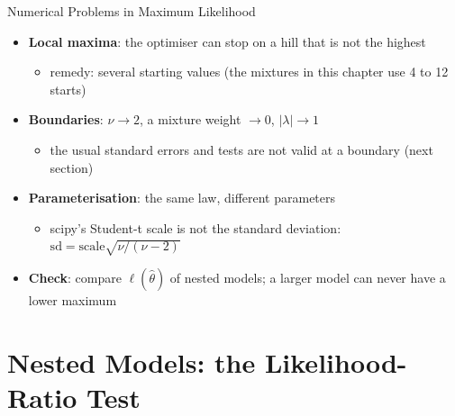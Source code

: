 \begin{frame}{Numerical Problems in Maximum Likelihood}
\itemsize{\small}
\begin{itemize}
    \item \textbf{Local maxima}: the optimiser can stop on a hill that is not the highest
    \begin{itemize}
        \item remedy: several starting values (the mixtures in this chapter use 4 to 12 starts)
    \end{itemize}
    \item \textbf{Boundaries}: $\nu \to 2$, a mixture weight $\to 0$, $|\lambda| \to 1$
    \begin{itemize}
        \item the usual standard errors and tests are not valid at a boundary (next section)
    \end{itemize}
    \item \textbf{Parameterisation}: the same law, different parameters
    \begin{itemize}
        \item scipy's Student-t scale is not the standard deviation: $\mathrm{sd} = \mathrm{scale}\sqrt{\nu/(\nu - 2)}$
    \end{itemize}
    \item \textbf{Check}: compare $\ell(\hat\theta)$ of nested models; a larger model can never have a lower maximum
\end{itemize}
\end{frame}


\section{Nested Models: the Likelihood-Ratio Test}

